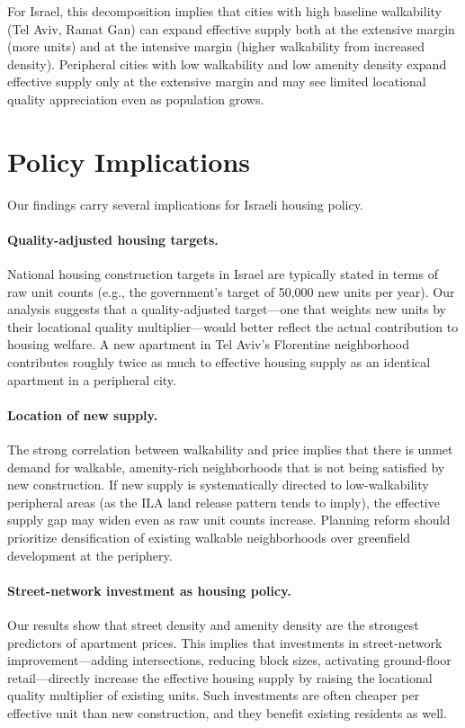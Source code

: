 \documentclass[12pt,a4paper]{article}
\begin{document}
For Israel, this decomposition implies that cities with high baseline walkability
(Tel Aviv, Ramat Gan) can expand effective supply both at the extensive margin
(more units) and at the intensive margin (higher walkability from increased
density).  Peripheral cities with low walkability and low amenity density expand
effective supply only at the extensive margin and may see limited locational
quality appreciation even as population grows.

\section{Policy Implications}
\label{sec:policy}

Our findings carry several implications for Israeli housing policy.

\paragraph{Quality-adjusted housing targets.}  National housing construction
targets in Israel are typically stated in terms of raw unit counts (e.g., the
government's target of 50,000 new units per year).  Our analysis suggests that
a quality-adjusted target—one that weights new units by their locational
quality multiplier—would better reflect the actual contribution to housing
welfare.  A new apartment in Tel Aviv's Florentine neighborhood contributes
roughly twice as much to effective housing supply as an identical apartment in
a peripheral city.

\paragraph{Location of new supply.}  The strong correlation between walkability
and price implies that there is unmet demand for walkable, amenity-rich
neighborhoods that is not being satisfied by new construction.  If new supply
is systematically directed to low-walkability peripheral areas (as the ILA land
release pattern tends to imply), the effective supply gap may widen even as
raw unit counts increase.  Planning reform should prioritize densification of
existing walkable neighborhoods over greenfield development at the periphery.

\paragraph{Street-network investment as housing policy.}  Our results show that
street density and amenity density are the strongest predictors of apartment
prices.  This implies that investments in street-network improvement—adding
intersections, reducing block sizes, activating ground-floor retail—directly
increase the effective housing supply by raising the locational quality
multiplier of existing units.  Such investments are often cheaper per effective
unit than new construction, and they benefit existing residents as well.
\end{document}

